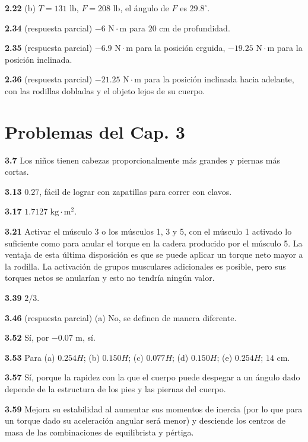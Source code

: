 \documentclass[12pt,a4paper]{book}
\begin{document}
\noindent \textbf{2.22} (b) $T = 131\text{ lb}$, $F = 208\text{ lb}$, el ángulo de $F$ es $29.8^\circ$.

\noindent \textbf{2.34} (respuesta parcial) $-6\text{ N}\cdot\text{m}$ para $20\text{ cm}$ de profundidad.

\noindent \textbf{2.35} (respuesta parcial) $-6.9\text{ N}\cdot\text{m}$ para la posición erguida, $-19.25\text{ N}\cdot\text{m}$ para la posición inclinada.

\noindent \textbf{2.36} (respuesta parcial) $-21.25\text{ N}\cdot\text{m}$ para la posición inclinada hacia adelante, con las rodillas dobladas y el objeto lejos de su cuerpo.

\section*{Problemas del Cap. 3}

\noindent \textbf{3.7} Los niños tienen cabezas proporcionalmente más grandes y piernas más cortas.

\noindent \textbf{3.13} $0.27$, fácil de lograr con zapatillas para correr con clavos.

\noindent \textbf{3.17} $1.7127\text{ kg}\cdot\text{m}^2$.

\noindent \textbf{3.21} Activar el músculo 3 o los músculos 1, 3 y 5, con el músculo 1 activado lo suficiente como para anular el torque en la cadera producido por el músculo 5. La ventaja de esta última disposición es que se puede aplicar un torque neto mayor a la rodilla. La activación de grupos musculares adicionales es posible, pero sus torques netos se anularían y esto no tendría ningún valor.

\noindent \textbf{3.39} $2/3$.

\noindent \textbf{3.46} (respuesta parcial) (a) No, se definen de manera diferente.

\noindent \textbf{3.52} Sí, por $-0.07\text{ m}$, sí.

\noindent \textbf{3.53} Para (a) $0.254H$; (b) $0.150H$; (c) $0.077H$; (d) $0.150H$; (e) $0.254H$; $14\text{ cm}$.

\noindent \textbf{3.57} Sí, porque la rapidez con la que el cuerpo puede despegar a un ángulo dado depende de la estructura de los pies y las piernas del cuerpo.

\noindent \textbf{3.59} Mejora su estabilidad al aumentar sus momentos de inercia (por lo que para un torque dado su aceleración angular será menor) y desciende los centros de masa de las combinaciones de equilibrista y pértiga.
\end{document}
